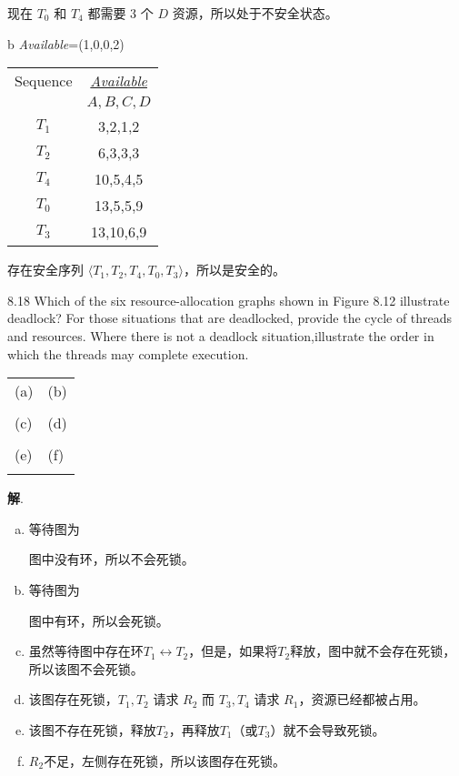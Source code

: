 \documentclass[12pt,a4paper]{article}
\newenvironment{problems}{\begin{list}{}{\renewcommand{\makelabel}[1]{\textbf{##1}\hfil}}}{\end{list}}
\newenvironment{steps}{\begin{list}{}{\renewcommand{\makelabel}[1]{##1.\hfil}}}{\end{list}}
\providecommand{\sol}{\textbf{解}.~}
\begin{document}
\begin{problems}
\begin{steps}
      现在 $T_0$ 和 $T_4$ 都需要 3 个 $D$ 资源，所以处于不安全状态。

       \item[b] \emph{Available}=(1,0,0,2)
       
       \begin{tabular}{cc}
        Sequence  & \underline{\emph{Available}} \\
          & $A,B,C,D$ \\
      $T_1$ & 3,2,1,2 \\
      $T_2$ & 6,3,3,3 \\
      $T_4$ & 10,5,4,5 \\
      $T_0$ & 13,5,5,9 \\
      $T_3$ & 13,10,6,9
      \end{tabular}

      存在安全序列 $\langle T_1,T_2,T_4,T_0,T_3\rangle$，所以是安全的。
   \end{steps}
    \item[8.18] Which of the six resource-allocation graphs shown in Figure 8.12 illustrate deadlock? For those situations that are deadlocked, provide the cycle of threads and resources. Where there is not a deadlock situation,illustrate the order in which the threads may complete execution.
    
    \begin{tabular}{|l|l|}
        \hline
        (a) & (b)\\
         & \\
        \hline
        (c) & (d)\\
         & \\
        \hline
        (e) & (f)\\
         & \\
        \hline
    \end{tabular}

    \sol
        \begin{enumerate}[(a)]
            \item 等待图为
            
            

            图中没有环，所以不会死锁。
            \item 等待图为
            
            

            图中有环，所以会死锁。
            \item 虽然等待图中存在环$T_1\leftrightarrow T_2$，但是，如果将$T_2$释放，图中就不会存在死锁，所以该图不会死锁。
            \item 该图存在死锁，$T_1,T_2$ 请求 $R_2$ 而 $T_3,T_4$ 请求 $R_1$，资源已经都被占用。
            \item 该图不存在死锁，释放$T_2$，再释放$T_1$（或$T_3$）就不会导致死锁。
            \item $R_2$不足，左侧存在死锁，所以该图存在死锁。
        \end{enumerate}


\end{problems}
\end{document}
